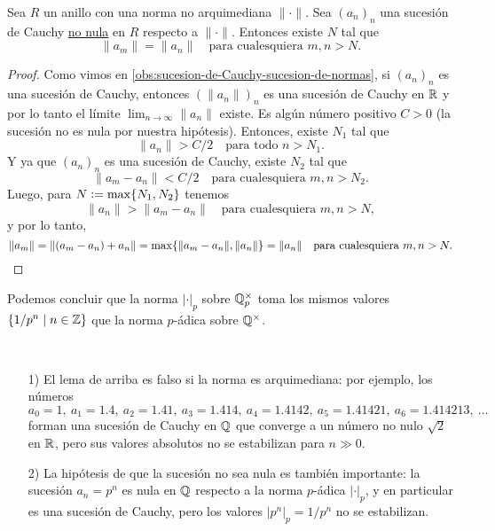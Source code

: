 \documentclass{article}
\numberwithin{equation}{section}
\theoremstyle{definition}
\begin{document}
\begin{lema}
  \label{lema:valores-absolutos-no-arquimedianos-se-estabilizan}
  Sea $R$ un anillo con una norma no arquimediana $\|\cdot\|$. Sea $(a_n)_n$
  una sucesión de Cauchy \underline{no nula} en $R$ respecto
  a $\|\cdot\|$. Entonces existe $N$ tal que
  $$\|a_m\| = \|a_n\|\quad\text{para cualesquiera }m,n > N.$$

  \begin{proof}
    Como vimos en \ref{obs:sucesion-de-Cauchy-sucesion-de-normas}, si $(a_n)_n$
    es una sucesión de Cauchy, entonces $(\|a_n\|)_n$ es una sucesión de Cauchy
    en $\mathbb{R}$ y por lo tanto el límite $\lim_{n\to\infty} \|a_n\|$ existe.
    Es algún número positivo $C > 0$ (la sucesión no es nula por nuestra
    hipótesis). Entonces, existe $N_1$ tal que
    $$\|a_n\| > C/2\quad\text{para todo }n > N_1.$$
    Y ya que $(a_n)_n$ es una sucesión de Cauchy, existe $N_2$ tal que
    $$\|a_m - a_n\| < C/2\quad\text{para cualesquiera }m,n > N_2.$$
    Luego, para $N \mathrel{\mathop:}= \max \{ N_1, N_2 \}$ tenemos
    $$\|a_n\| > \|a_m-a_n\| \quad \text{para cualesquiera }m,n > N,$$
    y por lo tanto,
    \[ \|a_m\| = \| (a_m - a_n) + a_n \|
               = \max \{ \|a_m-a_n\|, \|a_n\| \}
               = \|a_n\| \quad \text{para cualesquiera }m,n > N. \qedhere \]
  \end{proof}
\end{lema}

Podemos concluir que la norma $|\cdot|_p$ sobre $\mathbb{Q}_p^\times$ toma los mismos
valores $\{ 1/p^n \mid n\in\mathbb{Z} \}$ que la norma $p$-ádica sobre $\mathbb{Q}^\times$.

\begin{comentario}
  ~

  \begin{enumerate}
  \item[1)] El lema de arriba es falso si la norma es arquimediana: por ejemplo,
    los números
    \[ a_0 = 1, ~
       a_1 = 1.4, ~
       a_2 = 1.41, ~
       a_3 = 1.414, ~
       a_4 = 1.4142, ~
       a_5 = 1.41421, ~
       a_6 = 1.414213, ~
      \ldots \]
    forman una sucesión de Cauchy en $\mathbb{Q}$ que converge a un número no nulo
    $\sqrt{2}$ en $\mathbb{R}$, pero sus valores absolutos no se estabilizan para
    $n\gg 0$.

  \item[2)] La hipótesis de que la sucesión no sea nula es también importante:
    la sucesión $a_n = p^n$ es nula en $\mathbb{Q}$ respecto a la norma $p$-ádica
    $|\cdot|_p$, y en particular es una sucesión de Cauchy, pero los valores
    $|p^n|_p = 1/p^n$ no se estabilizan.
  \end{enumerate}
\end{comentario}
\end{document}
